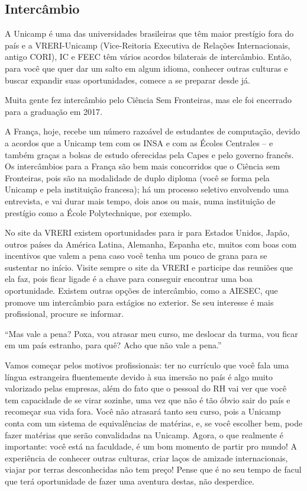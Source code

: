 \subsection{Intercâmbio}

A Unicamp é uma das universidades brasileiras que têm maior prestígio fora do país  e a VRERI-Unicamp (Vice-Reitoria Executiva de Relações Internacionais, antigo CORI), IC  e FEEC têm vários acordos bilaterais de intercâmbio. Então, para você que quer dar um  salto em algum idioma, conhecer outras culturas e buscar expandir suas oportunidades,  comece a se preparar desde já.

Muita gente fez intercâmbio pelo Ciência Sem Fronteiras, mas ele foi encerrado para  a graduação em 2017.

A França, hoje, recebe um número razoável de estudantes de computação, devido a  acordos que a Unicamp tem com os INSA e com as Écoles Centrales – e também graças a  bolsas de estudo oferecidas pela Capes e pelo governo francês. Os intercâmbios para a  França são bem mais concorridos que o Ciência sem Fronteiras, pois são na modalidade  de duplo diploma (você se forma pela Unicamp e pela instituição francesa); há um  processo seletivo envolvendo uma entrevista, e vai durar mais tempo, dois anos ou mais,  numa instituição de prestígio como a École Polytechnique, por exemplo.

No site da VRERI existem oportunidades para ir para Estados Unidos, Japão, outros  países da América Latina, Alemanha, Espanha etc, muitos com boas com incentivos que valem a pena caso você tenha um pouco de grana para se sustentar  no início. Visite sempre o site da VRERI e participe das reuniões que ela faz, pois ficar  ligade é a chave para conseguir encontrar uma boa oportunidade. Existem outras opções  de intercâmbio, como a AIESEC, que promove um intercâmbio para estágios no exterior.  Se seu interesse é mais profissional, procure se informar.

“Mas vale a pena? Poxa, vou atrasar meu curso, me deslocar da turma, vou ficar em  um país estranho, para quê? Acho que não vale a pena.”

Vamos começar pelos motivos profissionais: ter no currículo que você fala uma língua estrangeira fluentemente devido à sua imersão no país é algo muito valorizado  pelas empresas, além do fato que o pessoal do RH vai ver que você tem capacidade de  se virar sozinhe, uma vez que não é tão óbvio sair do país e recomeçar sua vida fora.  Você não atrasará tanto seu curso, pois a Unicamp conta com um sistema de  equivalências de matérias, e, se você escolher bem, pode fazer matérias que serão  convalidadas na Unicamp. Agora, o que realmente é importante: você está na faculdade,  é um bom momento de partir pro mundo! A experiência de conhecer outras culturas,  criar laços de amizade internacionais, viajar por terras desconhecidas não tem preço!  Pense que é no seu tempo de facul que terá oportunidade de fazer uma aventura destas,  não desperdice.

